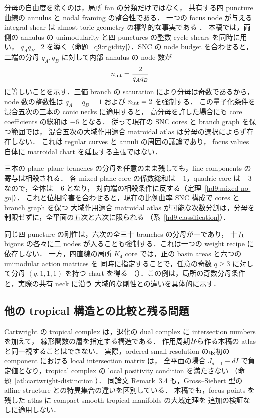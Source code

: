 分母の自由度を除くのは，局所 fan の分類だけではなく，
共有する四 puncture 曲線の annulus と nodal framing の整合性である．
一つの focus node が与える integral shear は almost toric geometry の標準的な事実である
\cite[\S4.3, equation~(4.10)]{SymingtonFour}．
本稿では，両側の annulus の unimodularity と四 punctures の整数 cycle shears を同時に用い，
$q_Aq_B\mid2$ を導く（命題~\ref{q9:rigidity}）．SNC の node budget を合わせると，
二端の分母 $q_A,q_B$ に対して内部 annulus の node 数が
\[
 n_{\rm int}=\frac{2}{q_Aq_B}
\]
に等しいことを示す．三価 branch の saturation により分母は奇数であるから，
node 数の整数性は $q_A=q_B=1$ および $n_{\rm int}=2$ を強制する．
この量子化条件を混合五次の三本の conic necks に適用すると，
高分母を許した場合にも core coefficients の総和は $-6$ となる．
従って現在の SNC cores と branch graph を保つ範囲では，
混合五次の大域作用適合 matroidal atlas は分母の選択によらず存在しない．
これは regular curves と annuli の周囲の議論であり，
focus values 自体に matroidal chart を延長する主張ではない．

三本の plane--plane branches の分母を任意のまま残しても，line components の寄与は相殺される．
各 mixed plane core の係数総和は $-1$，quadric core は $-3$ なので，全体は $-6$ となり，
対向端の相殺条件に反する（定理~\ref{hd9:mixed-no-go}）．
これと位相障害を合わせると，現在の比例曲率 SNC 構成で cores と branch graph を保つ
大域作用適合 matroidal atlas が可能な次数分割は，分母を制限せずに，全平面の五次と六次に限られる
（系~\ref{hd9:classification}）．

同じ四 puncture の剛性は，六次の全三十 branches の分母が一であり，
十五 bigons の各々に二 nodes が入ることも強制する．これは一つの weight recipe に依存しない．
一方，四直線の局所 $K_4$ core では，正の basin areas と六つの unimodular action matrices を
同時に指定することで，任意の奇数 $q\ge3$ に対して分母 $(q,1,1,1)$ を持つ chart を得る
（\cite{QuinticArithmetic}）．この例は，局所の奇数分母条件と，実際の共有 neck に沿う
大域的な剛性との違いを具体的に示す．

\subsection{他の tropical 構造との比較と残る問題}

Cartwright の tropical complex は，退化の dual complex に intersection numbers を加えて，
線形関数の層を指定する構造である\cite[Definitions~2.5, 2.8; Construction~3.2]{CartwrightComplexes}．
作用周期から作る本稿の atlas と同一視することはできない．
実際，ordered small resolution の最初の component における local intersection matrix は，
全平面の場合 $J_{d-1}-dI$ で負定値となり，tropical complex の local positivity condition を満たさない
（命題~\ref{atl:cartwright-distinction}）．
同論文 Remark~3.4 も，Gross--Siebert 型の affine structure との特異集合の違いを区別している．
本稿でも，focus points を残した atlas に compact smooth tropical manifolds の大域定理を
追加の検証なしに適用しない．


